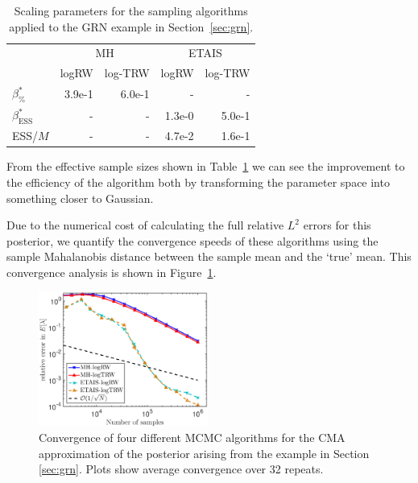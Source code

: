 \documentclass[final]{siamltex}
\newcommand{\edit}[1]{{\color{red} #1}}
\begin{document}
\begin{table}[!h]
	\centering
	\begin{tabular}{lrrrr}
	\toprule
		 & \multicolumn{2}{c}{MH} & \multicolumn{2}{c}{ETAIS} \\ \cmidrule(lr){2-3} \cmidrule(lr){4-5}
		& logRW & log-TRW & logRW & log-TRW \\ \midrule
		$\beta_{\%}^*$	 	& 3.9e-1 &6.0e-1 & - & - \\
		$\beta_{\text{ESS}}^*$	       & -            & -          & 1.3e-0 & 5.0e-1 \\
		ESS/$M$		 	 & -            & -            & 4.7e-2 & 1.6e-1  \\
	\bottomrule
	\end{tabular}
	\caption{Scaling parameters for the sampling algorithms applied to the GRN example in Section~\ref{sec:grn}.}
	\label{tab:grn_scaling_parameters}
\end{table}

From the effective sample sizes shown in
Table~\ref{tab:grn_scaling_parameters} we can see the improvement to
the efficiency of the algorithm both by transforming the parameter
space into something closer to Gaussian.

Due to the numerical cost of calculating the full relative $L^2$ errors for this posterior, we quantify the convergence speeds of these algorithms using the sample Mahalanobis distance between the sample mean and the `true' mean. This convergence analysis is shown in Figure~\ref{fig:grn_L2}.

\begin{figure}[!htb]
\centering
\includegraphics[width=0.495\textwidth]{"images/Applications/GRN_convergence_log"}
\caption{Convergence of four different MCMC algorithms for the CMA
  approximation of the  posterior arising from the example in Section
  \ref{sec:grn}. \edit{Plots show average
    convergence over 32 repeats.}}
\label{fig:grn_L2}
\end{figure}
\end{document}
